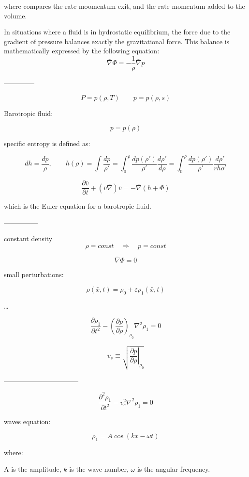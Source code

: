 where compares the rate moomentum exit, and the rate momentum added to the volume.



In situations where a fluid is in hydrostatic equilibrium, the force due to the gradient of pressure balances exactly the gravitational force. This balance is mathematically expressed by the following equation:
$$
\bar \nabla \Phi = - \frac{1}{\rho} \bar \nabla p
$$

--------------

$$
P = p(\rho, T) \qquad p = p(\rho, s)
$$

Barotropic fluid:

$$
p = p(\rho)
$$

specific entropy is defined as:

$$
dh = \dfrac{dp}{\rho}, \qquad h(\rho) = \int \dfrac{dp}{\rho'} = \int_0^\rho \dfrac{dp(\rho')}{\rho'} \dfrac{d\rho'}{d\rho} = \int_0^\rho \dfrac{dp(\rho')}{\rho'} \dfrac{d\rho'}{rho'}
$$


$$
\dfrac{\partial \bar v}{\partial t} + (\bar v \bar \nabla) \bar v = - \bar \nabla (h + \Phi)
$$

which is the Euler equation for a barotropic fluid.


---------------



constant density
$$
\rho = const \quad \Rightarrow \quad p = const
$$

$$
\bar \nabla \Phi = 0
$$

small perturbations:

$$
\rho(\bar x, t) = \rho_0 + \varepsilon \rho_1(\bar x, t)
$$

\dots

$$
\dfrac {\partial \rho_1}{\partial t^2} - \left( \dfrac{\partial p}{\partial \rho} \right)_{\rho_0} \nabla^2 \rho_1 = 0
$$

$$
v_s \equiv \sqrt{\left.\dfrac{\partial p}{\partial \rho} \right|_{\rho_0}}
$$

---------------------------------

$$
\dfrac{\partial^2 \rho_1}{\partial t^2} - v_s^2 \nabla^2 \rho_1 = 0
$$

waves equation:

$$
\rho_1 = A \cos (k x - \omega t)
$$

where:

A is the amplitude, $k$ is the wave number, $\omega$ is the angular frequency.

